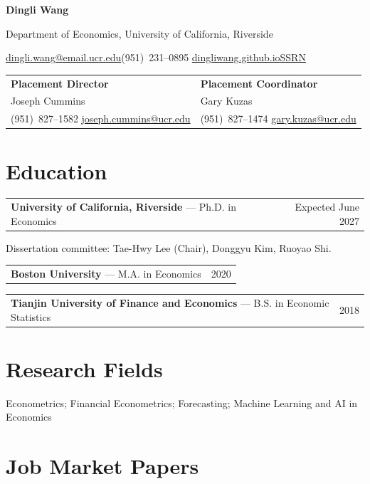 \documentclass[11pt,letterpaper]{article}
\makeatletter
\newcommand{\cvrow}[2]{\begin{tabularx}{\textwidth}{@{}Xr@{}}#1&#2\end{tabularx}\par\vspace{0.5pt}}
\makeatother
\begin{document}
\thispagestyle{plain}
{\fontsize{25}{28}\selectfont\bfseries Dingli Wang}\par
\vspace{1pt}
Department of Economics, University of California, Riverside\par
\href{mailto:dingli.wang@email.ucr.edu}{dingli.wang@email.ucr.edu}\quad\textbar\quad (951)~231--0895\quad\textbar\quad
\href{https://dingliwang.github.io/}{dingliwang.github.io}\quad\textbar\quad\href{https://papers.ssrn.com/sol3/cf_dev/AbsByAuth.cfm?per_id=10994248}{SSRN}

\vspace{1pt}
{\small
\begin{tabularx}{\textwidth}{@{}X X@{}}
\textbf{Placement Director} & \textbf{Placement Coordinator}\\
Joseph Cummins & Gary Kuzas\\
(951)~827--1582 \quad \href{mailto:joseph.cummins@ucr.edu}{joseph.cummins@ucr.edu} &
(951)~827--1474 \quad \href{mailto:gary.kuzas@ucr.edu}{gary.kuzas@ucr.edu}
\end{tabularx}}

\section{Education}
\cvrow{\textbf{University of California, Riverside} --- Ph.D. in Economics}{Expected June 2027}
{\small Dissertation committee: Tae-Hwy Lee (Chair), Donggyu Kim, Ruoyao Shi.}\par
\vspace{1pt}
\cvrow{\textbf{Boston University} --- M.A. in Economics}{2020}
\vspace{1pt}
\cvrow{\textbf{Tianjin University of Finance and Economics} --- B.S. in Economic Statistics}{2018}

\section{Research Fields}
Econometrics; Financial Econometrics; Forecasting; Machine Learning and AI in Economics

\section{Job Market Papers}
\end{document}
